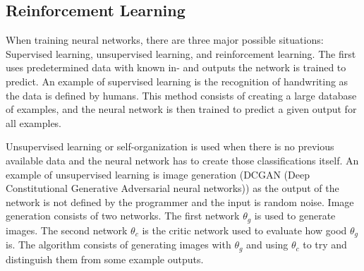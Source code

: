 \documentclass[12pt]{article}
\begin{document}
\subsection{Reinforcement Learning}
When training neural networks, there are three major possible situations: Supervised learning, unsupervised learning, and reinforcement learning. The first uses predetermined data with known in- and outputs the network is trained to predict. An example of supervised learning is the recognition of handwriting as the data is defined by humans. This method consists of creating a large database of examples, and the neural network is then trained to predict a given output for all examples. 

Unsupervised learning or self-organization is used when there is no previous available data and the neural network has to create those classifications itself. An example of unsupervised learning is image generation (DCGAN (Deep Constitutional Generative Adversarial neural networks)) as the output of the network is not defined by the programmer and the input is random noise. Image generation consists of two networks. The first network \(\theta_g\) is used to generate images. The second network \(\theta_c\) is the critic network used to evaluate how good  \(\theta_g\) is. The algorithm consists of generating images with \(\theta_g\) and using  \(\theta_c\) to try and distinguish them from some example outputs.
\end{document}
